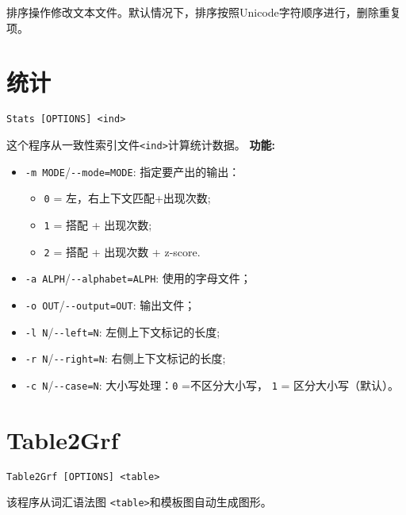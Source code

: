 \bigskip
\noindent 排序操作修改文本文件。默认情况下，排序按照Unicode字符顺序进行，删除重复项。








\section{统计}

\verb+Stats [OPTIONS] <ind>+

\bigskip
\noindent 这个程序从一致性索引文件\verb+<ind>+计算统计数据。
\bigskip
\noindent \textbf{功能:}
\begin{itemize}
\item \verb+-m MODE+/\verb+--mode=MODE+: 指定要产出的输出：
  \begin{itemize}
  \item \verb+0+ = 左，右上下文匹配+出现次数;
  \item \verb+1+ = 搭配 + 出现次数;
      \item \verb+2+ = 搭配 + 出现次数 + z-score.
  \end{itemize}

  \item \verb+-a ALPH+/\verb+--alphabet=ALPH+: 使用的字母文件；

  \item \verb+-o OUT+/\verb+--output=OUT+: 输出文件；

  \item \verb+-l N+/\verb+--left=N+: 左侧上下文标记的长度;
   
  \item \verb+-r N+/\verb+--right=N+: 右侧上下文标记的长度;
  
  \item \verb+-c N+/\verb+--case=N+: 大小写处理：\verb+0+ =不区分大小写，
\verb+1+ = 区分大小写（默认）。
\end{itemize}







\section{Table2Grf}
\verb+Table2Grf [OPTIONS] <table>+

\bigskip
\noindent {}
该程序从词汇语法图 \verb+<table>+和模板图自动生成图形。

